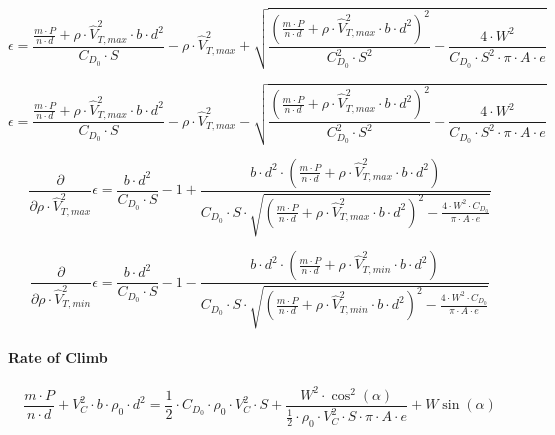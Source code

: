\documentclass[a4paper,10pt,pdftex]{article}
\begin{document}
\begin{equation}
  \epsilon = \frac{\frac{m\cdot{}P}{n\cdot{}d}+\rho\cdot{}\hat{V}_{T,max}^2\cdot{}b\cdot{}d^2}{C_{D_0}\cdot{}S} - \rho\cdot{}\hat{V}_{T,max}^2
  +\sqrt{\frac{\left(\frac{m\cdot{}P}{n\cdot{}d}+\rho\cdot{}\hat{V}_{T,max}^2\cdot{}b\cdot{}d^2\right)^2}{C_{D_0}^2\cdot{}S^2}-\frac{4\cdot{}W^2}{C_{D_0}\cdot{}S^2\cdot\pi\cdot{}A\cdot{}e}}
\end{equation}

\begin{equation}
  \epsilon = \frac{\frac{m\cdot{}P}{n\cdot{}d}+\rho\cdot{}\hat{V}_{T,max}^2\cdot{}b\cdot{}d^2}{C_{D_0}\cdot{}S} - \rho\cdot{}\hat{V}_{T,max}^2
  -\sqrt{\frac{\left(\frac{m\cdot{}P}{n\cdot{}d}+\rho\cdot{}\hat{V}_{T,max}^2\cdot{}b\cdot{}d^2\right)^2}{C_{D_0}^2\cdot{}S^2}-\frac{4\cdot{}W^2}{C_{D_0}\cdot{}S^2\cdot\pi\cdot{}A\cdot{}e}}
\end{equation}

\begin{equation}
  \frac{\partial}{\partial\rho\cdot{}\hat{V}_{T,max}^2}\epsilon = \frac{b\cdot{}d^2}{C_{D_0}\cdot{}S}-1+
  \frac{b\cdot{}d^2\cdot\left(\frac{m\cdot{}P}{n\cdot{}d}+\rho\cdot{}\hat{V}_{T,max}^2\cdot{}b\cdot{}d^2\right)}
  {C_{D_0}\cdot{}S\cdot\sqrt{\left(\frac{m\cdot{}P}{n\cdot{}d}+\rho\cdot{}\hat{V}_{T,max}^2\cdot{}b\cdot{}d^2\right)^2-
      \frac{4\cdot{}W^2\cdot{}C_{D_0}}{\pi\cdot{}A\cdot{}e}}}
\end{equation}

\begin{equation}
  \frac{\partial}{\partial\rho\cdot{}\hat{V}_{T,min}^2}\epsilon = \frac{b\cdot{}d^2}{C_{D_0}\cdot{}S}-1-
  \frac{b\cdot{}d^2\cdot\left(\frac{m\cdot{}P}{n\cdot{}d}+\rho\cdot{}\hat{V}_{T,min}^2\cdot{}b\cdot{}d^2\right)}
  {C_{D_0}\cdot{}S\cdot\sqrt{\left(\frac{m\cdot{}P}{n\cdot{}d}+\rho\cdot{}\hat{V}_{T,min}^2\cdot{}b\cdot{}d^2\right)^2-
      \frac{4\cdot{}W^2\cdot{}C_{D_0}}{\pi\cdot{}A\cdot{}e}}}
\end{equation}

\paragraph{Rate of Climb}

\begin{equation}
  \frac{m\cdot{}P}{n\cdot{}d}+V_C^2\cdot{}b\cdot\rho_0\cdot{}d^2=
  \frac{1}{2}\cdot{}C_{D_0}\cdot\rho_0\cdot{}V_C^2\cdot{}S
    + \frac{W^2\cdot\cos^2(\alpha)}{\frac{1}{2}\cdot\rho_0\cdot{}V_C^2\cdot{}S\cdot\pi\cdot{}A\cdot{}e}+W\sin(\alpha)
\end{equation}
\end{document}
